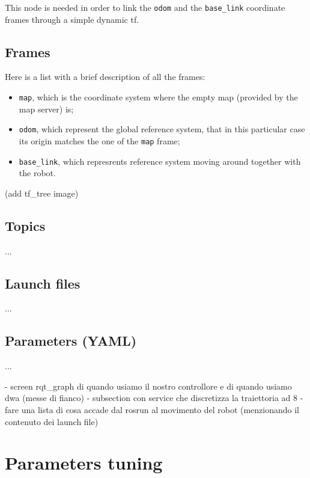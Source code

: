 \documentclass[11pt,a4paper]{article}
\begin{document}
This node is needed in order to link the \texttt{odom} and the \texttt{base\_link} coordinate frames through a simple dynamic tf.

\subsection{Frames}

Here is a list with a brief description of all the frames:
\begin{itemize}
 \item \texttt{map}, which is the coordinate system where the empty map (provided by the map server) is;
 \item \texttt{odom}, which represent the global reference system, that in this particular case its origin matches the one of the \texttt{map} frame;
 \item \texttt{base\_link}, which represrents reference system moving around together with the robot.
\end{itemize}

(add tf\_tree image)

\subsection{Topics}

...

\subsection{Launch files}

...


\subsection{Parameters (YAML)}

...



- screen rqt\_graph di quando usiamo il nostro controllore e di quando usiamo dwa (messe di fianco)
- subsection con service che discretizza la traiettoria ad 8
- fare una lista di cosa accade dal rosrun al movimento del robot (menzionando il contenuto dei launch file)



\section{Parameters tuning}
\end{document}
